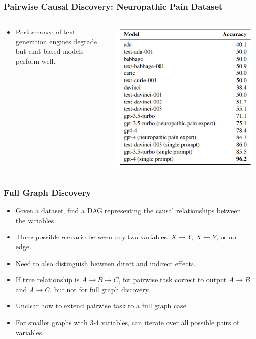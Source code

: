\documentclass{beamer}
\begin{document}
\begin{frame}
	\frametitle{Pairwise Causal Discovery: Neuropathic Pain Dataset}
	\begin{columns}
		\begin{column}{0.5 \textwidth}
			\begin{itemize}
				\item Performance of text generation engines degrade but chat-based models perform well.
			\end{itemize}
		\end{column}
		\begin{column}{0.5 \textwidth}
			\includegraphics[scale=0.25]{imgs/table4.png}
		\end{column}
	\end{columns}
\end{frame}

\begin{frame}
	\frametitle{Full Graph Discovery}
	\begin{itemize}
		\item Given a dataset, find a DAG representing the causal relationships between the variables.
		\item Three possible scenario between any two variables: $ X \rightarrow Y $, $ X \leftarrow Y $, or no edge.
		\item Need to also distinguish between direct and indirect effects.
		\item If true relationship is $ A \rightarrow B \rightarrow C $, for pairwise task correct to output $ A \rightarrow B $
			and $ A \rightarrow C $, but not for full graph discovery.
		\item Unclear how to extend pairwise task to a full graph case.
		\item For smaller graphs with 3-4 variables, can iterate over all possible pairs of variables.
	\end{itemize}
\end{frame}
\end{document}
